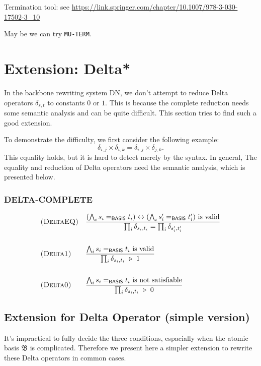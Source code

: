 Termination tool: see \url{https://link.springer.com/chapter/10.1007/978-3-030-17502-3_10}

May be we can try \texttt{MU-TERM}.

\section{Extension: Delta*}

In the backbone rewriting system DN, we don't attempt to reduce Delta operators $\delta_{s, t}$ to constants $0$ or $1$. This is because the complete reduction needs some semantic analysis and can be quite difficult. This section tries to find such a good extension.


To demonstrate the difficulty, we first consider the following example:
$$
\delta_{i, j} \times \delta_{i, k} = \delta_{i, j} \times \delta_{j, k}.
$$
This equality holds, but it is hard to detect merely by the syntax. In general, The equality and reduction of Delta operators need the semantic analysis, which is presented below.


\subsubsection*{\textsf{DELTA-COMPLETE}}

\begin{align*}
  & \textsc{(DeltaEQ)} && \frac{(\bigwedge_i s_i =_\textsf{BASIS} t_i) \leftrightarrow (\bigwedge_i s_i' =_\textsf{BASIS} t_i') \textrm{ is valid}}{\prod_i \delta_{s_i, t_i} = \prod_i \delta_{s_i', t_i'}} \\
  \\
  & \textsc{(Delta1)} && 
  \frac{\bigwedge_i s_i =_\textsf{BASIS} t_i \textrm{ is valid}}{ \prod_i \delta_{s_i, t_i} \ \triangleright\  1}
  \\
  \\
  & \textsc{(Delta0)} && 
  \frac{\bigwedge_i s_i =_\textsf{BASIS} t_i \textrm{ is not satisfiable}}{ \prod_i \delta_{s_i, t_i} \ \triangleright\  0}
\end{align*}



\subsection{Extension for Delta Operator (simple version)}
It's impractical to fully decide the three conditions, espacially when the atomic basis $\mathfrak{B}$ is complicated. Therefore we present here a simpler extension to rewrite these Delta operators in common cases.

